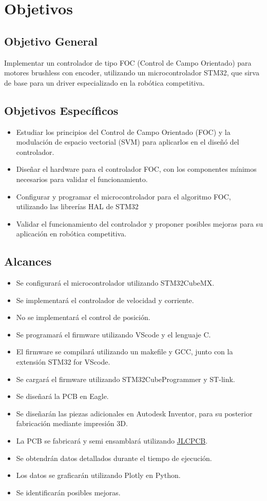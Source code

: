 \documentclass[11pt]{report}
\begin{document}
\section{Objetivos}
\subsection{Objetivo General}
Implementar un controlador de tipo FOC (Control de Campo Orientado) para motores brushless con encoder, utilizando un microcontrolador STM32, que sirva de base para un driver especializado en la robótica competitiva.

\subsection{Objetivos Específicos}
\begin{itemize}
	\item Estudiar los principios del Control de Campo Orientado (FOC) y la modulación de espacio vectorial (SVM) para aplicarlos en el diseñó del controlador.
	\item Diseñar el hardware para el controlador FOC, con los componentes mínimos necesarios para validar el funcionamiento.
	\item Configurar y programar el microcontrolador para el algoritmo FOC, utilizando las librerías HAL de STM32
	\item Validar el funcionamiento del controlador y proponer posibles mejoras para su aplicación en robótica competitiva.
\end{itemize}

\newpage
\subsection{Alcances}
\begin{itemize}
	\item Se configurará el microcontrolador utilizando STM32CubeMX.
	\item Se implementará el controlador de velocidad y corriente.
	\item No se implementará el control de posición.
	\item Se programará el firmware utilizando VScode y el lenguaje C.
	\item El firmware se compilará utilizando un makefile y GCC, junto con la extensión STM32 for VScode.
	\item Se cargará el firmware utilizando STM32CubeProgrammer y ST-link.
	\item Se diseñará la PCB en Eagle.
	\item Se diseñarán las piezas adicionales en Autodesk Inventor, para su posterior fabricación mediante impresión 3D.
	\item La PCB se fabricará y semi ensamblará utilizando \href{https://www.youtube.com/watch?v=riT4nl0T8_M}{JLCPCB}.
	\item Se obtendrán datos detallados durante el tiempo de ejecución.
	\item Los datos se graficarán utilizando Plotly en Python.
	\item Se identificarán posibles mejoras.
\end{itemize}
\end{document}
